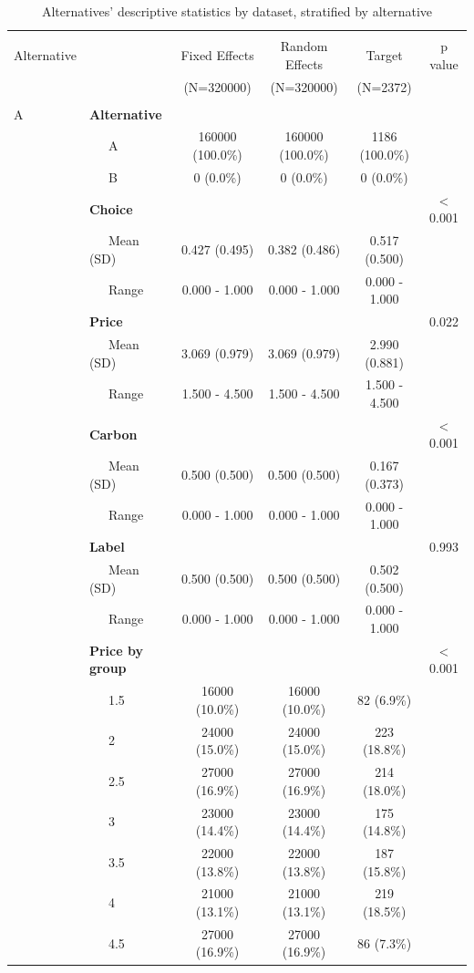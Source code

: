 \documentclass[12pt,]{article}
\begin{document}
\begin{table}[!htbp] \centering 
  \caption{Alternatives' descriptive statistics by dataset, stratified by alternative} 
  \label{tab:stratA} 
\begin{tabular}{@{\extracolsep{5pt}}llcccc}
\\[-1.8ex]\hline 
\hline \\[-1.8ex] 
Alternative &  & Fixed Effects  & Random Effects  & Target  & p value\\
 & & (N=320000) & (N=320000) & (N=2372) &  \\
\hline \\[-1.8ex] 
A & \textbf{Alternative} &  &  &  & \\
 & ~~~A & 160000 (100.0\%) & 160000 (100.0\%) & 1186 (100.0\%) & \\
 & ~~~B & 0 (0.0\%) & 0 (0.0\%) & 0 (0.0\%) & \\
 & \textbf{Choice} &  &  &  & < 0.001\\
 & ~~~Mean (SD) & 0.427 (0.495) & 0.382 (0.486) & 0.517 (0.500) & \\
 & ~~~Range & 0.000 - 1.000 & 0.000 - 1.000 & 0.000 - 1.000 & \\
 & \textbf{Price} &  &  &  & 0.022\\
 & ~~~Mean (SD) & 3.069 (0.979) & 3.069 (0.979) & 2.990 (0.881) & \\
 & ~~~Range & 1.500 - 4.500 & 1.500 - 4.500 & 1.500 - 4.500 & \\
 & \textbf{Carbon} &  &  &  & < 0.001\\
 & ~~~Mean (SD) & 0.500 (0.500) & 0.500 (0.500) & 0.167 (0.373) & \\
 & ~~~Range & 0.000 - 1.000 & 0.000 - 1.000 & 0.000 - 1.000 & \\
 & \textbf{Label} &  &  &  & 0.993\\
 & ~~~Mean (SD) & 0.500 (0.500) & 0.500 (0.500) & 0.502 (0.500) & \\
 & ~~~Range & 0.000 - 1.000 & 0.000 - 1.000 & 0.000 - 1.000 & \\
 & \textbf{Price by group} &  &  &  & < 0.001\\
 & ~~~1.5 & 16000 (10.0\%) & 16000 (10.0\%) & 82 (6.9\%) & \\
 & ~~~2 & 24000 (15.0\%) & 24000 (15.0\%) & 223 (18.8\%) & \\
 & ~~~2.5 & 27000 (16.9\%) & 27000 (16.9\%) & 214 (18.0\%) & \\
 & ~~~3 & 23000 (14.4\%) & 23000 (14.4\%) & 175 (14.8\%) & \\
 & ~~~3.5 & 22000 (13.8\%) & 22000 (13.8\%) & 187 (15.8\%) & \\
 & ~~~4 & 21000 (13.1\%) & 21000 (13.1\%) & 219 (18.5\%) & \\
 & ~~~4.5 & 27000 (16.9\%) & 27000 (16.9\%) & 86 (7.3\%) & \\
\hline
\end{tabular}
\end{table}
\end{document}
